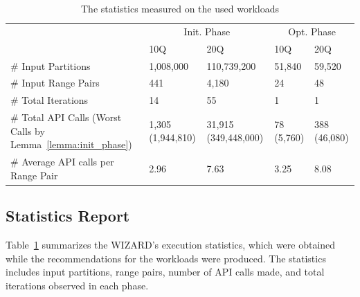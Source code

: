 \documentclass[paper]{ieice}
\begin{document}
\begin{table}[t]
\caption{The statistics measured on the used workloads\label{tab:workload_stat}}
\begin{center}
{\scriptsize
\begin{tabular}{|l|l|l|l|l|} \hline
		   			   							   & \multicolumn{2}{|c|}{Init. Phase} & \multicolumn{2}{|c|}{Opt. Phase} \\ \cline{2-5}
		   			   							   & 10Q & 20Q & 10Q & 20Q \\ \hline
{\# Input Partitions}  							   & 1,008,000 & 110,739,200 & 51,840 & 59,520 \\ \hline
{\# Input Range Pairs} 							   & 441 & 4,180 & 24 & 48\\ \hline
{\# Total Iterations}  							   & 14 & 55 & 1 & 1 \\ \hline
{\# Total API Calls (Worst Calls by Lemma~\ref{lemma:init_phase}})   & 1,305 (1,944,810) & 31,915 (349,448,000) & 78 (5,760) & 388 (46,080) \\ \hline
{\# Average API calls per Range Pair} 		  	   & 2.96 & 7.63 & 3.25 & 8.08 \\ \hline
\end{tabular}
}
\end{center}
\end{table}

\subsection{Statistics Report}
\label{sec:stat}

Table~\ref{tab:workload_stat} summarizes the WIZARD's execution statistics, 
which were obtained while the recommendations for the \hbox{workloads} were produced. 
The statistics includes input partitions, 
range pairs, number of API calls made, and total iterations 
observed in each phase. 
\end{document}
